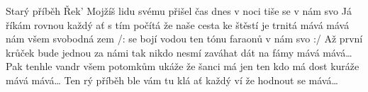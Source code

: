 \begin{TEXT}{Starý příběh}
\SLOKA Řek'  Mojžíš lidu svému přišel čas \NL
dnes v noci tiše  se   \NL
{}v nám  svo 
\SLOKA Já říkám rovnou každý ať s tím počítá \NL
že naše cesta ke štěstí je trnitá \NL
mává mává nám všem svobodná zem 
\REFREN  /:  se bojí vodou  \NL
ten  tónu faraonů   \NL
{}v nám  svo   :/
\SLOKA Až první krůček bude jednou za námi \NL
tak nikdo nesmí zaváhat dát na fámy \NL
mává mává… 
\SLOKA Pak tenhle vandr všem potomkům ukáže \NL
že šanci má jen ten kdo má dost kuráže \NL
mává mává… 
\REFRENHRAJ
\SLOKA Ten rý příběh ble vám tu klá \NL
ať každý ví že hodnout se   \NL
{} mává… 
\end{TEXT}
